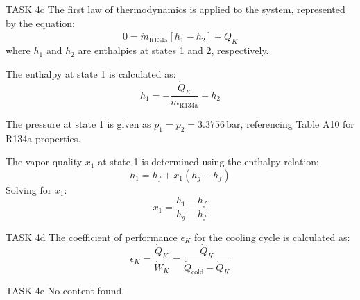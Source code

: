 TASK 4c  
The first law of thermodynamics is applied to the system, represented by the equation:  
\[
0 = \dot{m}_{\text{R134a}} \left[ h_1 - h_2 \right] + \dot{Q}_K
\]  
where \( h_1 \) and \( h_2 \) are enthalpies at states 1 and 2, respectively.  

The enthalpy at state 1 is calculated as:  
\[
h_1 = -\frac{\dot{Q}_K}{\dot{m}_{\text{R134a}}} + h_2
\]  

The pressure at state 1 is given as \( p_1 = p_2 = 3.3756 \, \text{bar} \), referencing Table A10 for R134a properties.  

The vapor quality \( x_1 \) at state 1 is determined using the enthalpy relation:  
\[
h_1 = h_f + x_1 \left( h_g - h_f \right)
\]  
Solving for \( x_1 \):  
\[
x_1 = \frac{h_1 - h_f}{h_g - h_f}
\]  

TASK 4d  
The coefficient of performance \( \epsilon_K \) for the cooling cycle is calculated as:  
\[
\epsilon_K = \frac{\dot{Q}_K}{\dot{W}_K} = \frac{\dot{Q}_K}{\dot{Q}_{\text{cold}} - \dot{Q}_K}
\]  

TASK 4e  
No content found.
